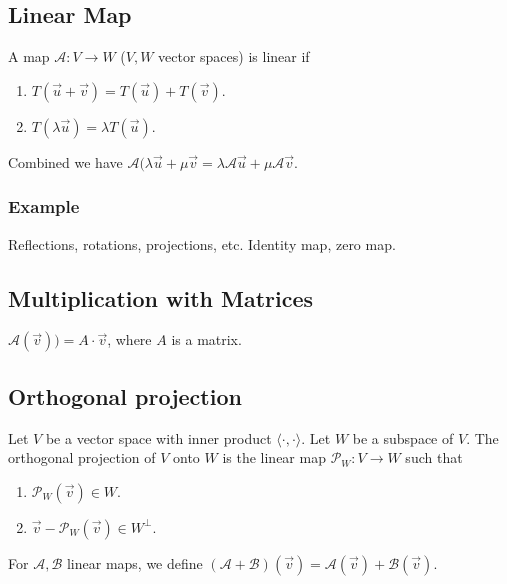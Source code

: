 \subsection{Linear Map}
\begin{definition}
    A map $\mathcal{A}: V \to W$ ($V, W$ vector spaces) is linear if
    \begin{enumerate}
        \item $T(\vec{u} + \vec{v}) = T(\vec{u}) + T(\vec{v})$.
        \item $T(\lambda\vec{u}) = \lambda T(\vec{u})$.
    \end{enumerate}
    Combined we have $\mathcal{A}(\lambda \vec{u} + \mu \vec{v} = \lambda\mathcal{A}\vec{u} + \mu\mathcal{A}\vec{v}$.
\end{definition}

\subsubsection{Example}
Reflections, rotations, projections, etc.
Identity map, zero map.

\subsection{Multiplication with Matrices}
$ \mathcal{A}(\vec{v})) = A \cdot \vec{v} $, where $A$ is a matrix.

\subsection{Orthogonal projection}
\begin{definition}
    Let $V$ be a vector space with inner product $\langle \cdot, \cdot \rangle$. Let $W$ be a subspace of $V$. The orthogonal projection of $V$ onto $W$ is the linear map $\mathcal{P}_W: V \to W$ such that
    \begin{enumerate}
        \item $\mathcal{P}_W(\vec{v}) \in W$.
        \item $\vec{v} - \mathcal{P}_W(\vec{v}) \in W^\perp$.
    \end{enumerate}
\end{definition}

\begin{theorem}[Addition]
    For $\mathcal{A}, \mathcal{B}$ linear maps, we define $(\mathcal{A} + \mathcal{B})(\vec{v}) = \mathcal{A}(\vec{v}) + \mathcal{B}(\vec{v})$.
\end{theorem}

